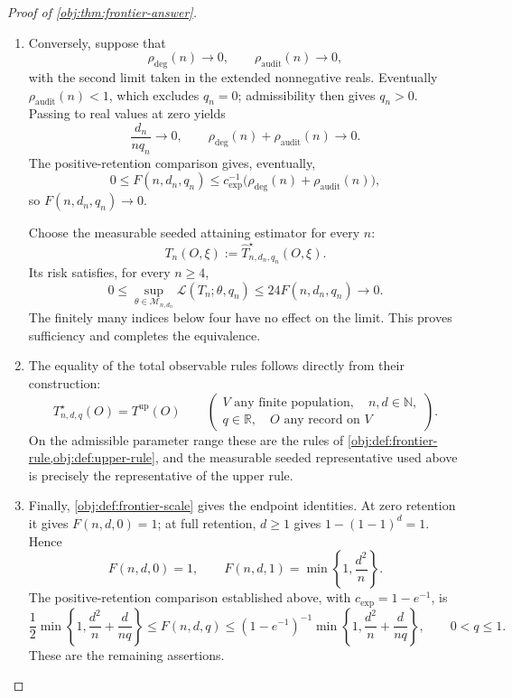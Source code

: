 \begin{proof}[Proof of \cref{obj:thm:frontier-answer}]
\begin{enumerate}
\item Conversely, suppose that
\[
\rho_{\mathrm{deg}}(n)\longrightarrow0,
\qquad
\rho_{\mathrm{audit}}(n)\longrightarrow0,
\]
with the second limit taken in the extended nonnegative reals. Eventually
\(\rho_{\mathrm{audit}}(n)<1\), which excludes \(q_n=0\); admissibility then gives
\(q_n>0\). Passing to real values at zero yields
\[
\frac{d_n}{nq_n}\longrightarrow0,
\qquad
\rho_{\mathrm{deg}}(n)+\rho_{\mathrm{audit}}(n)\longrightarrow0.
\]
The positive-retention comparison gives, eventually,
\[
0\le F(n,d_n,q_n)
\le c_{\mathrm{exp}}^{-1}
\bigl(\rho_{\mathrm{deg}}(n)+\rho_{\mathrm{audit}}(n)\bigr),
\]
so \(F(n,d_n,q_n)\to0\).

Choose the measurable seeded attaining estimator for every \(n\):
\[
T_n(O,\xi):=\widehat T^\star_{n,d_n,q_n}(O,\xi).
\]
Its risk satisfies, for every \(n\ge4\),
\[
0\le
\sup_{\theta\in\mathcal M_{n,d_n}}\mathcal L(T_n;\theta,q_n)
\le24F(n,d_n,q_n)\longrightarrow0.
\]
The finitely many indices below four have no effect on the limit. This proves sufficiency and completes the equivalence.

\item The equality of the total observable rules follows directly from their construction:
\[
T^\star_{n,d,q}(O)=T^{\mathrm{up}}(O)
\qquad
\left(
\begin{array}{l}
V\text{ any finite population},\quad n,d\in\mathbb N,\\
q\in\mathbb R,\quad O\text{ any record on }V
\end{array}
\right).
\]
On the admissible parameter range these are the rules of
\cref{obj:def:frontier-rule,obj:def:upper-rule}, and the measurable seeded representative used above is precisely the representative of the upper rule.

\item Finally, \cref{obj:def:frontier-scale} gives the endpoint identities. At zero retention it gives \(F(n,d,0)=1\); at full retention, \(d\ge1\) gives \(1-(1-1)^d=1\). Hence
\[
F(n,d,0)=1,
\qquad
F(n,d,1)=\min\left\{1,\frac{d^2}{n}\right\}.
\]
The positive-retention comparison established above, with
\(c_{\mathrm{exp}}=1-e^{-1}\), is
\[
\frac12\min\left\{1,\frac{d^2}{n}+\frac{d}{nq}\right\}
\le F(n,d,q)
\le
(1-e^{-1})^{-1}
\min\left\{1,\frac{d^2}{n}+\frac{d}{nq}\right\},
\qquad 0<q\le1.
\]
These are the remaining assertions.
\end{enumerate}
\end{proof}
